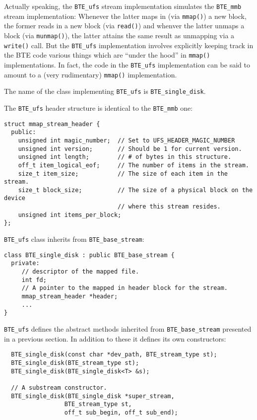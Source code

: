 Actually speaking, the \verb|BTE_ufs| stream implementation simulates
the \verb|BTE_mmb| stream implementation: Whenever the latter maps in
(via  \verb|mmap()|) a new block, the former reads in a new block (via
\verb|read()|) and whenver the latter unmaps a block (via
\verb|munmap()|), the latter attains the same result as unmapping via
a \verb|write()| call. But  the \verb|BTE_ufs| implementation involves
explicitly keeping track in the BTE code various things which are 
``under the hood'' in \verb|mmap()| implementations. In fact, the code
in the  \verb|BTE_ufs| implementation can be said to amount to a
(very rudimentary) \verb|mmap()| implementation.

The name of the class implementing  \verb|BTE_ufs| is \verb|BTE_single_disk|.

The \verb|BTE_ufs| header structure is identical to the \verb|BTE_mmb|
one:
\begin{verbatim}
struct mmap_stream_header { 
  public:
    unsigned int magic_number;  // Set to UFS_HEADER_MAGIC_NUMBER
    unsigned int version;       // Should be 1 for current version.
    unsigned int length;        // # of bytes in this structure.
    off_t item_logical_eof;     // The number of items in the stream.
    size_t item_size;           // The size of each item in the stream.
    size_t block_size;          // The size of a physical block on the device
                                // where this stream resides.
    unsigned int items_per_block;
};
\end{verbatim}

\verb|BTE_ufs| class inherits from \verb|BTE_base_stream|:
\begin{verbatim}
class BTE_single_disk : public BTE_base_stream {
  private:
     // descriptor of the mapped file.  
     int fd;   
     // A pointer to the mapped in header block for the stream. 
     mmap_stream_header *header;
     ...
}  
\end{verbatim}

\verb|BTE_ufs| defines the abstract methods inherited from
\verb|BTE_base_stream| presented in a previous section. In addition to
these it defines its own constructors:
\begin{verbatim}
  BTE_single_disk(const char *dev_path, BTE_stream_type st); 
  BTE_single_disk(BTE_stream_type st); 
  BTE_single_disk(BTE_single_disk<T> &s); 
  
  // A substream constructor.
  BTE_single_disk(BTE_single_disk *super_stream,
                 BTE_stream_type st,
                 off_t sub_begin, off_t sub_end);
\end{verbatim}

